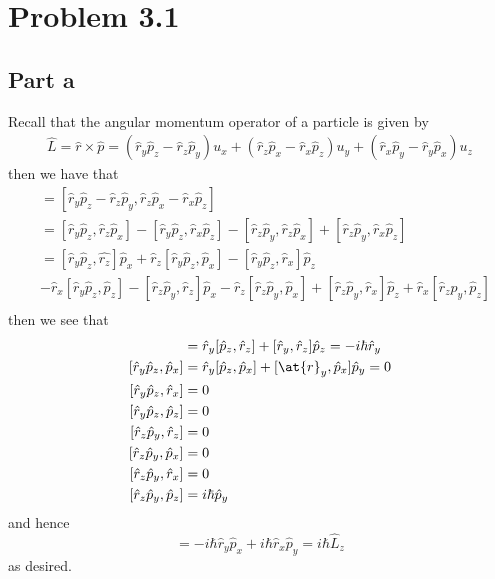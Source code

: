 \documentclass[12pt]{report}
\begin{document}
\maketitle
\section*{Problem 3.1}
\subsection*{Part a}
Recall that the angular momentum operator of a particle is given by
\begin{align*}
  \hat{L} = \hat{r} \times \hat{p} = (\hat{r}_y \hat{p}_z - \hat{r}_z \hat{p}_y) u_x + (\hat{r}_z \hat{p}_x - \hat{r}_x \hat{p}_z) u_y + (\hat{r}_x \hat{p}_y - \hat{r}_y \hat{p}_x) u_z
\end{align*}
then we have that 
\begin{align*}
  [\hat{L}_x, \hat{L}_y] &= [\hat{r}_y \hat{p}_z - \hat{r}_z \hat{p}_y, \hat{r}_z \hat{p}_x - \hat{r}_x \hat{p}_z] \\ 
                         &= [\hat{r}_y\hat{p}_z, \hat{r}_z\hat{p}_x] - [\hat{r}_y\hat{p}_z, \hat{r}_x\hat{p}_z] - [\hat{r}_z\hat{p}_y, \hat{r}_z\hat{p}_x] + [\hat{r}_z\hat{p}_y, \hat{r}_x\hat{p}_z] \\
                         &= [\hat{r}_y\hat{p}_z,\hat{r_z}] \hat{p}_x + \hat{r}_z[\hat{r}_y\hat{p}_z,\hat{p}_x] - [\hat{r}_y\hat{p}_z,\hat{r}_x]\hat{p}_z \\
                         &- \hat{r}_x[\hat{r}_y\hat{p}_z,\hat{p}_z] - [\hat{r}_z\hat{p}_y,\hat{r}_z]\hat{p}_x - \hat{r}_z[\hat{r}_z\hat{p}_y,\hat{p}_x] + [\hat{r}_z\hat{p}_y,\hat{r}_x]\hat{p}_z + \hat{r}_x[\hat{r}_z\hat{p}_y,\hat{p}_z] \\
\end{align*}
then we see that
\begin{align*}
  [\hat{r}_y\hat{p}_z, \hat{r}_z] &= \hat{r}_y[\hat{p}_z,\hat{r}_z] + [\hat{r}_y,\hat{r}_z]\hat{p}_z = -i\hbar \hat{r}_y \\
  [\hat{r}_y\hat{p}_z, \hat{p}_x] &= \hat{r}_y[\hat{p}_z, \hat{p}_x] + [\at{r}_y, \hat{p}_x] \hat{p}_y = 0 \\
  [\hat{r}_y\hat{p}_z, \hat{r}_x] &= 0 \\
  [\hat{r}_y\hat{p}_z, \hat{p}_z] &= 0 \\
  [\hat{r}_z \hat{p}_y, \hat{r}_z] &= 0 \\
  [\hat{r}_z \hat{p}_y, \hat{p}_x] &= 0 \\
  [\hat{r}_z \hat{p}_y, \hat{r}_x] &= 0 \\
  [\hat{r}_z \hat{p}_y, \hat{p}_z] &= i\hbar \hat{p}_y
  \end{align*}
  and hence 
  \begin{equation*}
    [\hat{L}_x, \hat{L}_y] = -i\hbar \hat{r}_y \hat{p}_x + i\hbar \hat{r}_x \hat{p}_y = i\hbar \hat{L}_z
  \end{equation*}
  as desired.
\end{document}
